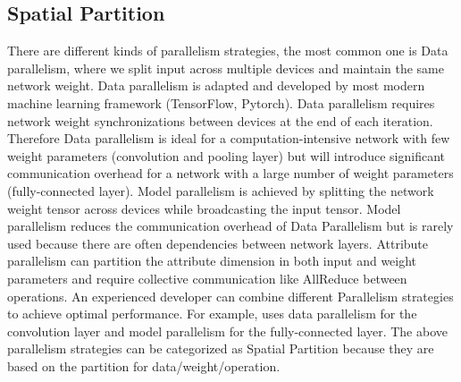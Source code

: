\documentclass[sigplan, nonacm]{acmart}\settopmatter{printfolios=true,printccs=false,printacmref=false}
\begin{document}
 \subsection{Spatial Partition}There are different kinds of parallelism strategies, the most common one is Data parallelism\cite{krizhevsky2012imagenet}, where we split input across multiple devices and maintain the same network weight. Data parallelism is adapted and developed by most modern machine learning framework (TensorFlow\cite{abadi2016tensorflow}, Pytorch\cite{paszke2019pytorch}). Data parallelism requires network weight synchronizations between devices at the end of each iteration. Therefore Data parallelism is ideal for a computation-intensive network with few weight parameters (convolution and pooling layer) but will introduce significant communication overhead for a network with a large number of weight parameters (fully-connected layer). Model parallelism\cite{dean2012large} is achieved by splitting the network weight tensor across devices while broadcasting the input tensor. Model parallelism reduces the communication overhead of Data Parallelism but is rarely used because there are often dependencies between network layers. Attribute parallelism\cite{jia2019beyond} can partition the attribute dimension in both input and weight parameters and require collective communication like AllReduce between operations. An experienced developer can combine different Parallelism strategies to achieve optimal performance. For example, \cite{krizhevsky2014one} uses data parallelism for the convolution layer and model parallelism for the fully-connected layer. The above parallelism strategies can be categorized as Spatial Partition because they are based on the partition for data/weight/operation. \par
\end{document}
